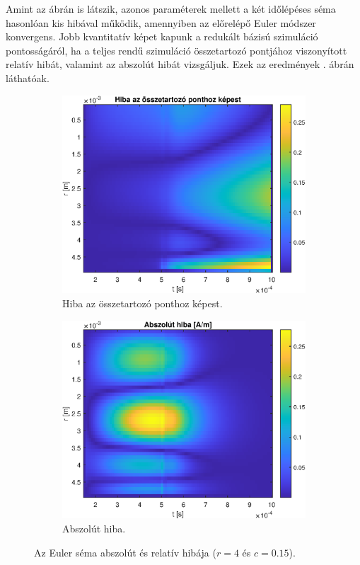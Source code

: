         \par
        Amint az ábrán is látszik, azonos paraméterek mellett a két időlépéses séma hasonlóan kis hibával működik, amennyiben az előrelépő Euler módszer konvergens. Jobb kvantitatív képet kapunk a redukált bázisú szimuláció pontosságáról, ha a teljes rendű szimuláció összetartozó pontjához viszonyított relatív hibát, valamint az abszolút hibát vizsgáljuk. Ezek az eredmények . ábrán láthatóak.
        \begin{figure}[h]
            \centering
            \begin{subfigure}{0.48\textwidth}
                \includegraphics[width=\textwidth]{kep/euler_0.15_4_rel_error.eps}
                \caption{Hiba az összetartozó ponthoz képest.}
            \end{subfigure}
            \begin{subfigure}{0.48\textwidth}
                \includegraphics[width=\textwidth]{kep/euler_0.15_4_abs_error.eps}
                \caption{Abszolút hiba.}
            \end{subfigure}
            \caption{Az Euler séma abszolút és relatív hibája ($r=4$ és $c=0.15$).}
            \label{fig:hiba}
        \end{figure}
